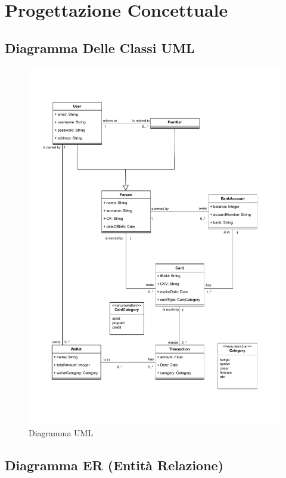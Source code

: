 \chapter{Progettazione Concettuale}

\section{Diagramma Delle Classi UML}

\begin{figure}[!h]
    \centering
    \includegraphics[scale=0.55]{pdfs/UMLdiagram.drawio.pdf}
    \caption{Diagramma UML}\label{UML}
\end{figure}

\section{Diagramma ER (Entità Relazione)}

